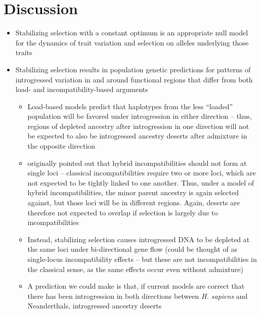 \documentclass{article}
\begin{document}
\section*{Discussion}

\begin{itemize}
    \item Stabilizing selection with a constant optimum is an appropriate
        null model for the dynamics of trait variation and selection on
        alleles underlying those traits
    \item Stabilizing selection results in population genetic predictions
        for patterns of introgressed variation in and around functional
        regions that differ from both load- and incompatibility-based arguments
        \begin{itemize}
            \item Load-based models predict that haplotypes from the less ``loaded''
                population will be favored under introgression in either direction
                -- thus, regions of depleted ancestry after introgression in one
                direction will not be expected to also be introgressed ancestry
                deserts after admixture in the opposite direction
            \item \citet{mueller1942} originally pointed out that hybrid
                incompatibilities should not form at single loci -- classical
                incompatibilities require two or more loci, which are not
                expected to be tightly linked to one another. Thus, under a
                model of hybrid incompatibilities, the minor parent ancestry
                is again selected against, but those loci will be in different
                regions. Again, deserts are therefore not expected to overlap
                if selection is largely due to incompatibilities
            \item Instead, stabilizing selection causes introgressed DNA to be
                depleted at the same loci under bi-directional gene flow
                (could be thought of as single-locus incompatibility effects --
                but these are not incompatibilities in the classical sense,
                as the same effects occur even without admixture)
            \item A prediction we could make is that, if current models are correct
                that there has been introgression in both directions between
                \emph{H. sapiens} and Neanderthals, introgressed ancestry deserts

\end{itemize}
\end{itemize}
\end{document}
